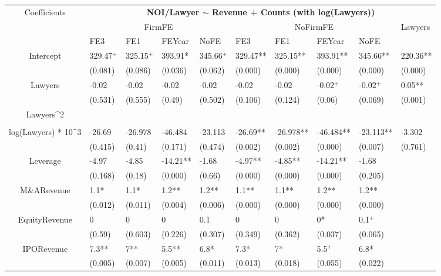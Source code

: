 \documentclass{article}
\begin{document}
\begin{table}[H]
\centering
\begin{tabular}{|clllllllll|}
\hline
\multirow{3}{*}{Coefficients} & \multicolumn{9}{c|}{\textbf{NOI/Lawyer $\sim$ Revenue + Counts (with log(Lawyers))}} \\
\cline{2-10}
& \multicolumn{4}{c}{FirmFE} & \multicolumn{4}{c}{NoFirmFE} & \multirow{2}{*}{Lawyers} \\
\cline{2-9}
& FE3 & FE1 & FEYear & NoFE & FE3 & FE1 & FEYear & NoFE &  \\
\hline
 
Intercept & 329.47$^{+}$ & 325.15$^{+}$ & 393.91* & 345.66$^{+}$ & 329.47** & 325.15** & 393.91** & 345.66** & 220.36** \\ 
   & (0.081) & (0.086) & (0.036) & (0.062) & (0.000) & (0.000) & (0.000) & (0.000) & (0.000) \\ 
  Lawyers & -0.02 & -0.02 & -0.02 & -0.02 & -0.02 & -0.02 & -0.02$^{+}$ & -0.02$^{+}$ & 0.05** \\ 
   & (0.531) & (0.555) & (0.49) & (0.502) & (0.106) & (0.124) & (0.06) & (0.069) & (0.001) \\ 
  Lawyers^2 &  &  &  &  &  &  &  &  &  \\ 
   &  &  &  &  &  &  &  &  &  \\ 
  log(Lawyers) * 10^3 & -26.69 & -26.978 & -46.484 & -23.113 & -26.69** & -26.978** & -46.484** & -23.113** & -3.302 \\ 
   & (0.415) & (0.41) & (0.171) & (0.474) & (0.002) & (0.002) & (0.000) & (0.007) & (0.761) \\ 
  Leverage & -4.97 & -4.85 & -14.21** & -1.68 & -4.97** & -4.85** & -14.21** & -1.68 &  \\ 
   & (0.168) & (0.18) & (0.000) & (0.66) & (0.000) & (0.000) & (0.000) & (0.205) &  \\ 
  M\&ARevenue & 1.1* & 1.1* & 1.2** & 1.2** & 1.1** & 1.1** & 1.2** & 1.2** &  \\ 
   & (0.012) & (0.011) & (0.004) & (0.006) & (0.000) & (0.000) & (0.000) & (0.000) &  \\ 
  EquityRevenue & 0 & 0 & 0 & 0.1 & 0 & 0 & 0* & 0.1$^{+}$ &  \\ 
   & (0.59) & (0.603) & (0.226) & (0.307) & (0.349) & (0.362) & (0.037) & (0.065) &  \\ 
  IPORevenue & 7.3** & 7** & 5.5** & 6.8* & 7.3* & 7* & 5.5$^{+}$ & 6.8* &  \\ 
   & (0.005) & (0.007) & (0.005) & (0.011) & (0.013) & (0.018) & (0.055) & (0.022) &  \\ 

\end{tabular}
\end{table}
\end{document}
